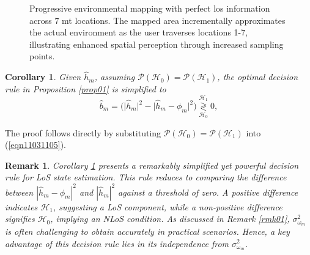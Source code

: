 \documentclass[conference, a4paper]{IEEEtran}
\newtheorem{cor}{Corollary}
\newtheorem{rmk}{Remark}
\newcommand{\corref}[1]{{\it Corollary \ref{#1}}}
\renewcommand{\eqref}[1]{(\ref{#1})}
\newcommand{\propref}[1]{{\it Proposition \ref{#1}}}
\newcommand{\remref}[1]{{\it Remark \ref{#1}}}
\begin{document}
\begin{figure*}[t]
	\caption{\label{fig02} Progressive environmental mapping with perfect \gls{los} information across $7$ \gls{mt} locations. The mapped area incrementally approximates the actual environment as the user traverses locations 1-7, illustrating enhanced spatial perception through increased sampling points.}
	\vspace{-1em}
\end{figure*}

\begin{cor} \label{cor01}
	Given $\hat{h}_{m}$, assuming $\mathcal{P}(\mathcal{H}_{0}) = \mathcal{P}(\mathcal{H}_{1})$, the optimal decision rule in \propref{prop01} is simplified to
	\begin{equation} \label{eqn05330925}
		\hat{b}_{m} =\Big(\big|\hat{h}_{m}\big|^{2} - \big|\hat{h}_{m} - 	\phi_{m}\big|^{2}\Big) \underset{\mathcal{H}_{0}}{\overset{\mathcal{H}_{1}}{\gtrless}} 0,
	\end{equation}
\end{cor}

\begin{IEEEproof}
 	The proof follows directly by substituting $\mathcal{P}(\mathcal{H}_{0}) = \mathcal{P}(\mathcal{H}_{1})$ into \eqref{eqn11031105}.
\end{IEEEproof}

\begin{rmk}
\corref{cor01} presents a remarkably simplified yet powerful decision rule for LoS state estimation.
This rule reduces to comparing the difference between $|\hat{h}_{m} - \phi_{m}|^{2}$ and $|\hat{h}_{m}|^{2}$ against a threshold of zero.
A positive difference indicates $\mathcal{H}_{1}$, suggesting a LoS component, while a non-positive difference signifies $\mathcal{H}_{0}$, implying an NLoS condition.
As discussed in \remref{rmk01}, $\sigma_{\omega_{m}}^{2}$ is often challenging to obtain accurately in practical scenarios.
Hence, a key advantage of this decision rule lies in its independence from $\sigma_{\omega_{m}}^{2}$.
\end{rmk}
\end{document}
